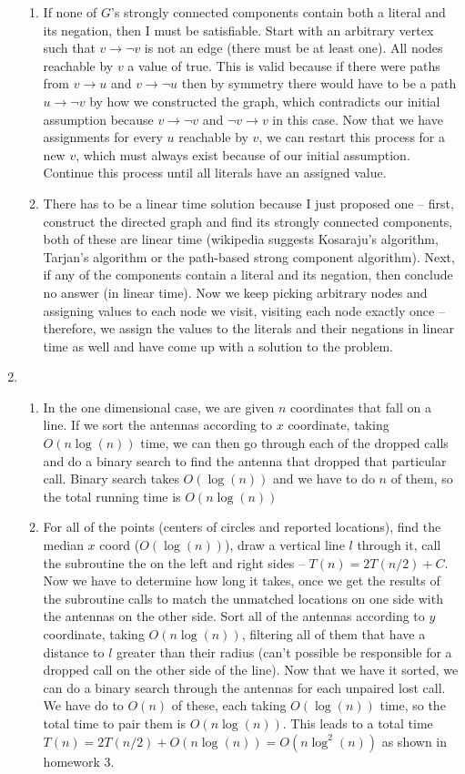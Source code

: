 \documentclass[11pt]{article}
\begin{document}
\begin{enumerate}
\begin{enumerate}
\item If none of $G$'s strongly connected components contain both a literal and its negation, then I must be satisfiable. Start with an arbitrary vertex such that $v\to \neg v$ is not an edge (there must be at least one). All nodes reachable by $v$ a value of true. This is valid because if there were paths from $v\to u$ and $v\to \neg u$ then by symmetry there would have to be a path $u\to \neg v$ by how we constructed the graph, which contradicts our initial assumption because $v\to \neg v$ and $\neg v \to v$ in this case. Now that we have assignments for every $u$ reachable by $v$, we can restart this process for a new $v$, which must always exist because of our initial assumption. Continue this process until all literals have an assigned value.
\item There has to be a linear time solution because I just proposed one -- first, construct the directed graph and find its strongly connected components, both of these are linear time (wikipedia suggests Kosaraju's algorithm, Tarjan's algorithm or the path-based strong component algorithm). Next, if any of the components contain a literal and its negation, then conclude no answer (in linear time). Now we keep picking arbitrary nodes and assigning values to each node we visit, visiting each node exactly once -- therefore, we assign the values to the literals and their negations in linear time as well and have come up with a solution to the problem. 
\end{enumerate}
\newpage
\item
\begin{enumerate}
\item In the one dimensional case, we are given $n$ coordinates that fall on a line. If we sort the antennas according to $x$ coordinate, taking $O(n\log(n))$ time, we can then go through each of the dropped calls and do a binary search to find the antenna that dropped that particular call. Binary search takes $O(\log(n))$ and we have to do $n$ of them, so the total running time is $O(n\log(n))$
\item For all of the points (centers of circles and reported locations), find the median $x$ coord ($O(\log(n))$), draw a vertical line $l$ through it, call the subroutine the on the left and right sides -- $T(n)=2T(n/2)+C$. Now we have to determine how long it takes, once we get the results of the subroutine calls to match the unmatched locations on one side with the antennas on the other side. Sort all of the antennas according to $y$ coordinate, taking $O(n\log(n))$, filtering all of them that have a distance to $l$ greater than their radius (can't possible be responsible for a dropped call on the other side of the line). Now that we have it sorted, we can do a binary search through the antennas for each unpaired lost call. We have do to $O(n)$ of these, each taking $O(\log(n))$ time, so the total time to pair them is $O(n\log(n))$. This leads to a total time $T(n)=2T(n/2)+O(n\log(n))=O(n\log^2(n))$ as shown in homework 3.

\end{enumerate}
\end{enumerate}
\end{document}
